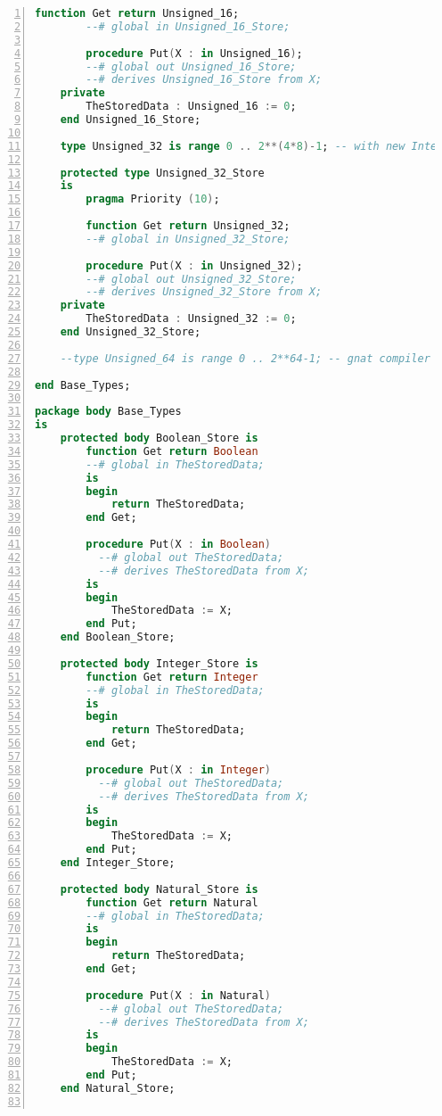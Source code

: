 \begin{lstlisting}[language=ada, gobble=0, numbers=left, caption={\lstinline{Base_Types} package}]
        function Get return Unsigned_16;
        --# global in Unsigned_16_Store;

        procedure Put(X : in Unsigned_16);
        --# global out Unsigned_16_Store;
        --# derives Unsigned_16_Store from X;
    private
        TheStoredData : Unsigned_16 := 0;
    end Unsigned_16_Store;

    type Unsigned_32 is range 0 .. 2**(4*8)-1; -- with new Integer gnat compiler error: value not in range of type "Standard.Integer"

    protected type Unsigned_32_Store
    is
        pragma Priority (10);

        function Get return Unsigned_32;
        --# global in Unsigned_32_Store;

        procedure Put(X : in Unsigned_32);
        --# global out Unsigned_32_Store;
        --# derives Unsigned_32_Store from X;
    private
        TheStoredData : Unsigned_32 := 0;
    end Unsigned_32_Store;

    --type Unsigned_64 is range 0 .. 2**64-1; -- gnat compiler error: integer type definition bounds out of range

end Base_Types;

package body Base_Types
is
    protected body Boolean_Store is
        function Get return Boolean
        --# global in TheStoredData;
        is
        begin
            return TheStoredData;
        end Get;

        procedure Put(X : in Boolean)
          --# global out TheStoredData;
          --# derives TheStoredData from X;
        is
        begin
            TheStoredData := X;
        end Put;
    end Boolean_Store;

    protected body Integer_Store is
        function Get return Integer
        --# global in TheStoredData;
        is
        begin
            return TheStoredData;
        end Get;

        procedure Put(X : in Integer)
          --# global out TheStoredData;
          --# derives TheStoredData from X;
        is
        begin
            TheStoredData := X;
        end Put;
    end Integer_Store;

    protected body Natural_Store is
        function Get return Natural
        --# global in TheStoredData;
        is
        begin
            return TheStoredData;
        end Get;

        procedure Put(X : in Natural)
          --# global out TheStoredData;
          --# derives TheStoredData from X;
        is
        begin
            TheStoredData := X;
        end Put;
    end Natural_Store;


\end{lstlisting}
